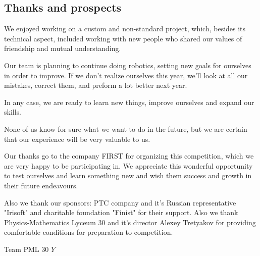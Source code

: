 
\subsection{Thanks and prospects} 
We enjoyed working on a custom and non-standard project, which, besides its technical aspect, included working with new people who shared our values of friendship and mutual understanding. 

Our team is planning to continue doing robotics, setting new goals for ourselves in order to improve. If we don't realize ourselves this year, we'll look at all our mistakes, correct them, and preform a lot better next year.

In any case, we are ready to learn new things, improve ourselves and expand our skills. 

None of us know for sure what we want to do in the future, but we are certain that our experience will be very valuable to us. 

Our thanks go to the company FIRST for organizing this competition, which we are very happy to be participating in. We appreciate this wonderful opportunity to test ourselves and learn something new and wish them success and growth in their future endeavours.

Also we thank our sponsors: PTC company and it's Russian representative "Irisoft" and charitable foundation "Finist" for their support. Also we thank Physics-Mathematics Lyceum 30 and it's director Alexey Tretyakov for providing comfortable conditions for preparation to competition.


\begin{center}
	Team PML 30 ${Y}$
\end{center}

\vspace{0.5em}

\begin{figure}[H]
	\begin{minipage}[h]{0.47\linewidth}
	\end{minipage}
	\hfill
	\begin{minipage}[h]{0.47\linewidth}
	\end{minipage}
\end{figure}

